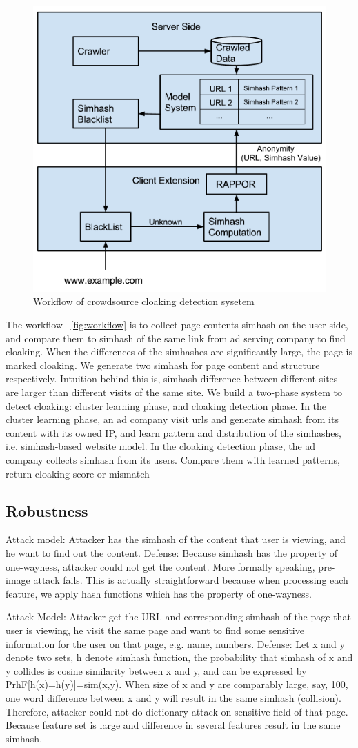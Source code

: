 \begin{figure}[t]
  \centering
  \includegraphics[width=.45\textwidth]{fig/crowdsourcing-cloaking-detection-system}
  \caption{Workflow of crowdsource cloaking detection sysetem}
  \label{fig:workflow}
\end{figure}


The workflow ~\autoref{fig:workflow} is to collect page contents simhash on the user side, and compare
them to simhash of the same link from ad serving company to find cloaking. When
the differences of the simhashes are significantly large, the page is marked
cloaking. We generate two simhash for page content and structure respectively.
Intuition behind this is, simhash difference between different sites are larger
than different visits of the same site. We build a two-phase system to detect
cloaking: cluster learning phase, and cloaking detection phase. In the cluster
learning phase, an ad company visit urls and generate simhash from its content
with its owned IP, and learn pattern and distribution of the simhashes, i.e.
simhash-based website model. In the cloaking detection phase, the ad company
collects simhash from its users. Compare them with learned patterns, return
cloaking score or mismatch


\subsection{Robustness}
Attack model: Attacker has the simhash of the content that user is viewing, and
he want to find out the content.
Defense: Because simhash has the property of one-wayness, attacker could not get
the content. More formally speaking, pre-image attack fails. This is actually
straightforward because when processing each feature, we apply hash functions
which has the property of one-wayness.

Attack Model: Attacker get the URL and corresponding simhash of the page that
user is viewing, he visit the same page and want to find some sensitive
information for the user on that page, e.g. name, numbers.
Defense: Let x and y denote two sets, h denote simhash function, the probability
that simhash of x and y collides is cosine similarity between x and y, and can
be expressed by PrhF[h(x)=h(y)]=sim(x,y). When size of x and y are comparably
large, say, 100, one word difference between x and y will result in the same
simhash (collision). Therefore, attacker could not do dictionary attack on
sensitive field of that page. Because feature set is large and difference in
several features result in the same simhash.

